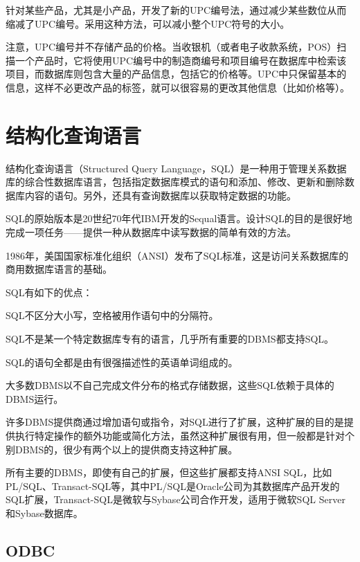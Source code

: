 针对某些产品，尤其是小产品，开发了新的UPC编号法，通过减少某些数位从而缩减了UPC编号。采用这种方法，可以减小整个UPC符号的大小。

注意，UPC编号并不存储产品的价格。当收银机（或者电子收款系统，POS）扫描一个产品时，它将使用UPC编号中的制造商编号和项目编号在数据库中检索该项目，而数据库则包含大量的产品信息，包括它的价格等。UPC中只保留基本的信息，这样不必更改产品的标签，就可以很容易的更改其他信息（比如价格等）。



\chapter{结构化查询语言}


结构化查询语言（Structured Query Language，SQL）是一种用于管理关系数据库的综合性数据库语言，包括指定数据库模式的语句和添加、修改、更新和删除数据库内容的语句。另外，还具有查询数据库以获取特定数据的功能。

SQL的原始版本是20世纪70年代IBM开发的Sequal语言。设计SQL的目的是很好地完成一项任务——提供一种从数据库中读写数据的简单有效的方法。

1986年，美国国家标准化组织（ANSI）发布了SQL标准，这是访问关系数据库的商用数据库语言的基础。

SQL有如下的优点：

\begin{compactitem}
\item SQL不区分大小写，空格被用作语句中的分隔符。
\item SQL不是某一个特定数据库专有的语言，几乎所有重要的DBMS都支持SQL。
\item SQL的语句全都是由有很强描述性的英语单词组成的。
\end{compactitem}

大多数DBMS以不自己完成文件分布的格式存储数据，这些SQL依赖于具体的DBMS运行。

许多DBMS提供商通过增加语句或指令，对SQL进行了扩展，这种扩展的目的是提供执行特定操作的额外功能或简化方法，虽然这种扩展很有用，但一般都是针对个别DBMS的，很少有两个以上的提供商支持这种扩展。

所有主要的DBMS，即使有自己的扩展，但这些扩展都支持ANSI SQL，比如PL/SQL、Transact-SQL等，其中PL/SQL是Oracle公司为其数据库产品开发的SQL扩展，Transact-SQL是微软与Sybase公司合作开发，适用于微软SQL Server和Sybase数据库。
\section{ODBC}


